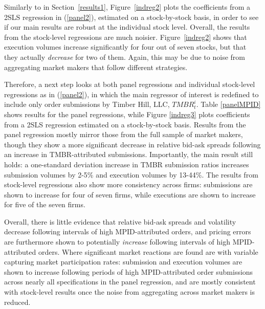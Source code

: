 \documentclass{article}
\begin{document}
Similarly to in Section~\ref{results1}, Figure~\ref{indreg2} plots the coefficients from a 2SLS regression in (\ref{panel2}), estimated on a stock-by-stock basis, in order to see if our main results are robust at the individual stock level. Overall, the results from the stock-level regressions are much noisier. Figure~\ref{indreg2} shows that execution volumes increase significantly for four out of seven stocks, but that they actually \emph{decrease} for two of them. Again, this may be due to noise from aggregating market makers that follow different strategies.

Therefore, a next step looks at both panel regressions and individual stock-level regressions as in (\ref{panel2}), in which the main regressor of interest is redefined to include only order submissions by Timber Hill, LLC, $TMBR_t^i$. Table \ref{panelMPID} shows results for the panel regressions, while Figure \ref{indreg3} plots coefficients from a 2SLS regression estimated on a stock-by-stock basis. Results from the panel regression mostly mirror those from the full sample of market makers, though they show a more significant decrease in relative bid-ask spreads following an increase in TMBR-attributed submissions. Importantly, the main result still holds: a one-standard deviation increase in TMBR submission ratios increases submission volumes by 2-5\% and execution volumes by 13-44\%. The results from stock-level regressions also show more consistency across firms: submissions are shown to increase for four of seven firms, while executions are shown to increase for five of the seven firms. 

Overall, there is little evidence that relative bid-ask spreads and volatility decrease following intervals of high MPID-attributed orders, and pricing errors are furthermore shown to potentially \emph{increase} following intervals of high MPID-attributed orders. Where significant market reactions are found are with variable capturing market participation rates: submission and execution volumes are shown to increase following periods of high MPID-attributed order submissions across nearly all specifications in the panel regression, and are mostly consistent with stock-level results once the noise from aggregating across market makers is reduced.
\end{document}
